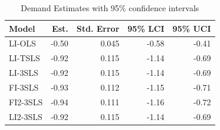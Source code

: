 
\begin{table}[htbp]
\centering
\caption{Demand Estimates with 95\% confidence intervals}
\label{tab:estimates2}
\begin{tabular}{lrrrr}
\toprule
Model & Est. & Std. Error & 95\% LCI & 95\% UCI \\
\midrule
LI-OLS    & -0.50 & 0.045 & -0.58 & -0.41 \\
LI-TSLS   & -0.92 & 0.115 & -1.14 & -0.69 \\
LI-3SLS   & -0.92 & 0.115 & -1.14 & -0.69 \\
FI-3SLS   & -0.93 & 0.112 & -1.15 & -0.71 \\
FI2-3SLS  & -0.94 & 0.111 & -1.16 & -0.72 \\
LI2-3SLS  & -0.92 & 0.115 & -1.14 & -0.69 \\
\bottomrule
\end{tabular}
\end{table}

